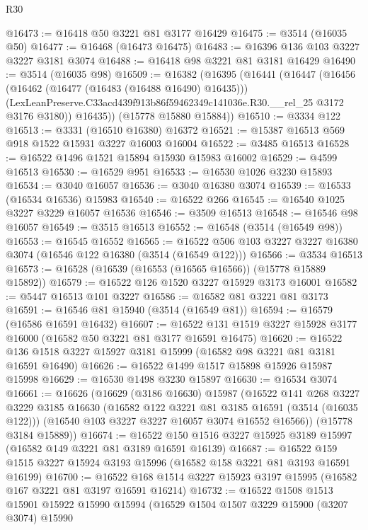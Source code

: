 \begin{lexlean}{R30}
\begin{coremodule}
@16473 := @16418 @50 @3221 @81 @3177 @16429
@16475 := @3514 (@16035 @50)
@16477 := @16468 (@16473 @16475)
@16483 := @16396 @136 @103 @3227 @3227 @3181 @3074
@16488 := @16418 @98 @3221 @81 @3181 @16429
@16490 := @3514 (@16035 @98)
@16509 := @16382
    (@16395
      (@16441
        (@16447
          (@16456
            (@16462 (@16477 (@16483 (@16488 @16490) @16435)))
            (LexLeanPreserve.C33acd439f913b86f59462349c141036e.R30.__rel_25 @3172 @3176 @3180))
          @16435))
      (@15778 @15880 @15884))
@16510 := @3334 @122
@16513 := @3331 (@16510 @16380) @16372
@16521 := @15387 @16513 @569 @918 @1522 @15931 @3227 @16003 @16004
@16522 := @3485 @16513
@16528 := @16522 @1496 @1521 @15894 @15930 @15983 @16002
@16529 := @4599 @16513
@16530 := @16529 @951
@16533 := @16530 @1026 @3230 @15893
@16534 := @3040 @16057
@16536 := @3040 @16380 @3074
@16539 := @16533 (@16534 @16536) @15983
@16540 := @16522 @266
@16545 := @16540 @1025 @3227 @3229 @16057 @16536
@16546 := @3509 @16513
@16548 := @16546 @98 @16057
@16549 := @3515 @16513
@16552 := @16548 (@3514 (@16549 @98))
@16553 := @16545 @16552
@16565 := @16522 @506 @103 @3227 @3227 @16380 @3074 (@16546 @122 @16380 (@3514 (@16549 @122)))
@16566 := @3534 @16513
@16573 := @16528 (@16539 (@16553 (@16565 @16566)) (@15778 @15889 @15892))
@16579 := @16522 @126 @1520 @3227 @15929 @3173 @16001
@16582 := @5447 @16513 @101 @3227
@16586 := @16582 @81 @3221 @81 @3173
@16591 := @16546 @81 @15940 (@3514 (@16549 @81))
@16594 := @16579 (@16586 @16591 @16432)
@16607 := @16522 @131 @1519 @3227 @15928 @3177 @16000 (@16582 @50 @3221 @81 @3177 @16591 @16475)
@16620 := @16522 @136 @1518 @3227 @15927 @3181 @15999 (@16582 @98 @3221 @81 @3181 @16591 @16490)
@16626 := @16522 @1499 @1517 @15898 @15926 @15987 @15998
@16629 := @16530 @1498 @3230 @15897
@16630 := @16534 @3074
@16661 := @16626
    (@16629
      (@3186 @16630)
      @15987
      (@16522
        @141
        @268
        @3227
        @3229
        @3185
        @16630
        (@16582 @122 @3221 @81 @3185 @16591 (@3514 (@16035 @122)))
        (@16540 @103 @3227 @3227 @16057 @3074 @16552 @16566))
      (@15778 @3184 @15889))
@16674 := @16522 @150 @1516 @3227 @15925 @3189 @15997 (@16582 @149 @3221 @81 @3189 @16591 @16139)
@16687 := @16522 @159 @1515 @3227 @15924 @3193 @15996 (@16582 @158 @3221 @81 @3193 @16591 @16199)
@16700 := @16522 @168 @1514 @3227 @15923 @3197 @15995 (@16582 @167 @3221 @81 @3197 @16591 @16214)
@16732 := @16522
    @1508
    @1513
    @15901
    @15922
    @15990
    @15994
    (@16529
      @1504
      @1507
      @3229
      @15900
      (@3207 @3074)
      @15990

\end{coremodule}
\end{lexlean}
